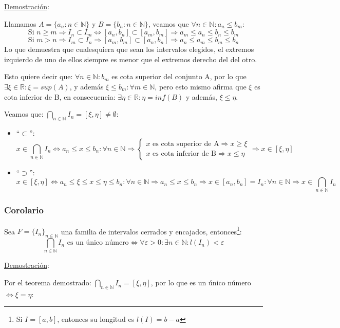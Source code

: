 \documentclass[10pt,a4paper,openright]{book}
\begin{document}
\underline{Demostración}:\par
Llamamos $A=\{a_n: n\in \mathbb N\}$ y $B=\{b_n: n\in \mathbb N\}$, veamos que $\forall n\in \mathbb N: a_n\leq b_m$:
$$\mbox{Si }n\geq m\Rightarrow I_n\subset I_m\Leftrightarrow [a_n,b_n]\subset [a_m, b_m]\Rightarrow a_m\leq a_n\leq b_n\leq b_m$$
$$\mbox{Si }m>n\Rightarrow I_m\subset I_n\Rightarrow [a_m,b_m]\subset[a_n,b_n]\Rightarrow a_n\leq a_m\leq b_m\leq b_n$$
Lo que demuestra que cualesquiera que sean los intervalos elegidos, el extremos izquierdo de uno de ellos siempre es menor que el extremos derecho del del otro.\par 
Esto quiere decir que: $\forall n\in \mathbb N: b_m$ es cota superior del conjunto A, por lo que $\exists \xi\in \mathbb R: \xi=sup (A)$, y además $\xi\leq b_m :\forall m\in \mathbb N$, pero esto mismo afirma que $\xi$ es cota inferior de B, en consecuencia: $\exists \eta\in \mathbb R: \eta=inf(B)$ y además, $\xi\leq\eta$.\par
Veamos que: $\bigcap_{n\in \mathbb N}I_n=[\xi, \eta]\neq \emptyset$:
\begin{itemize}
\item ``$\subset$'':
$$x\in \bigcap_{n\in \mathbb N}I_n\Leftrightarrow a_n\leq x\leq b_n: \forall n \in \mathbb N\Rightarrow\begin{cases} x \mbox{ es cota superior de A}\Rightarrow x\geq\xi \\
x\mbox{ es cota inferior de B}\Rightarrow x\leq \eta\end{cases}\Rightarrow x\in [\xi,\eta]$$

\item ``$\supset$'':
$$x\in [\xi,\eta]\Leftrightarrow a_n\leq \xi\leq x\leq \eta\leq b_n: \forall n \in \mathbb N\Rightarrow a_n\leq x\leq b_n\Rightarrow x\in [a_n,b_n]=I_n: \forall n\in \mathbb N\Rightarrow x\in \bigcap_{n\in \mathbb N}I_n$$
\end{itemize}

\subsubsection*{Corolario}
Sea $F=\{I_n\}_{n\in \mathbb N}$ una familia de intervalos cerrados y encajados, entonces\footnote{Si $I=[a,b]$, entonces su longitud es $l(I)=b-a$}:
$$\bigcap_{n\in \mathbb N}I_n\mbox{ es un único número}\Leftrightarrow \forall \varepsilon>0: \exists n\in \mathbb N: l(I_n)<\varepsilon$$

\underline{Demostración}:\par
Por el teorema demostrado: $\bigcap_{n\in \mathbb N}I_n=[\xi,\eta]$, por lo que es un único número $\Leftrightarrow \xi=\eta$:
\end{document}
